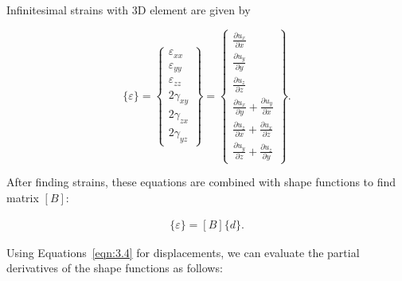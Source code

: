 \noindent Infinitesimal strains with 3D element are given by

\begin{equation}
\{\varepsilon\}
=
\begin{Bmatrix}
\varepsilon_{xx} \\
\varepsilon_{yy} \\
\varepsilon_{zz} \\
2\gamma_{xy} \\
2\gamma_{zx} \\
2\gamma_{yz}
\end{Bmatrix}
=
\begin{Bmatrix}
\frac{\partial{u_{x}}}{\partial{x}} \\
\frac{\partial{u_{y}}}{\partial{y}} \\
\frac{\partial{u_{z}}}{\partial{z}} \\
\frac{\partial{u_{x}}}{\partial{y}} + \frac{\partial{u_{y}}}{\partial{x}} \\
\frac{\partial{u_{z}}}{\partial{x}} + \frac{\partial{u_{x}}}{\partial{z}} \\
\frac{\partial{u_{y}}}{\partial{z}} + \frac{\partial{u_{z}}}{\partial{y}}
\end{Bmatrix}.
\end{equation}

\noindent After finding strains, these equations are combined with shape functions to find matrix $[B]$:


\begin{equation}
\begin{array}{l}
\{\varepsilon\} = [B]\{d\}.
\end{array}
\label{eqn:3.6}
\end{equation}

\noindent Using Equations~\ref{eqn:3.4} for displacements, we can evaluate the partial derivatives of the shape functions as follows:

